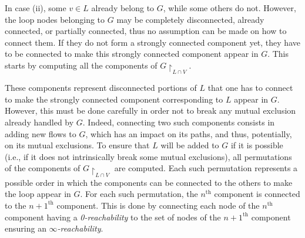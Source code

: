 \documentclass{article}
\newcommand{\graph}{G~=~(V,~E,~\Sigma)}
\newcommand{\restrictionof}[2]{\ensuremath{#1\restriction_{#2}}}
\newcommand{\transition}[2]{#1~\rightarrow~#2}
\newtheorem{definition}{Definition}
\begin{document}
	In case (ii), some $v \in L$ already belong to $G$, while some others do not.
	However, the loop nodes belonging to $G$ may be completely disconnected, already connected, or partially connected, thus no assumption can be made on how to connect them.
	If they do not form a strongly connected component yet, they have to be connected to make this strongly connected component appear in $G$.
	This starts by computing all the components of $\restrictionof{G}{L \cap V}$.
	
	\begin{comment}
		These graphs have the particularity of being \textit{directly connected}.
		
		\begin{definition}[Directly Connected Graph]
			Let $\graph$ be a graph.
			A graph $\widehat{G} = (\widehat{V} \subseteq V, \ \widehat{E} \subseteq \widehat{V} \times \widehat{V}, \ \widehat{\Sigma} \subseteq \Sigma)$ is said to be directly connected if and only if $\forall v_i \in \widehat{V}, \ \exists v_j \in \widehat{V}, \ v_i \neq v_j$, such that $\transition{v_i}{v_j} \in E \ \lor \ \transition{v_j}{v_i} \in E$.
		\end{definition}
		
		Then, the largest of them, called \textit{largest connected graphs}, are retrieved, as they represent the largest disconnected portions of the loop to insert.
		
		\begin{definition}[Largest Directly Connected Graph]
			Let $\graph$ be a graph and $S_{\widehat{G}} = \{\widehat{G}_1, ..., \widehat{G}_n\}$ be the set of all directly connected sub-graphs such that $V_{\widehat{G}_1} = V_{\widehat{G}_2} = ... = V_{\widehat{G}_n}$ and $E_{\widehat{G}_1} \neq E_{\widehat{G}_2} \neq ... \neq E_{\widehat{G}_n}$. The largest directly connected sub-graph of $S_{\widehat{G}}$ is the graph $\widehat{G}_L \in S_{\widehat{G}}$ such that $\lvert E_{\widehat{G}_L} \rvert = \max\limits_{i \in [1...n]} \lvert E_{\widehat{G}_i} \rvert$.
		\end{definition}
	\end{comment}
	
	These components represent disconnected portions of $L$ that one has to connect to make the strongly connected component corresponding to $L$ appear in $G$.
	However, this must be done carefully in order not to break any mutual exclusion already handled by $G$.
	Indeed, connecting two such components consists in adding new flows to $G$, which has an impact on its paths, and thus, potentially, on its mutual exclusions.
	To ensure that $L$ will be added to $G$ if it is possible (i.e., if it does not intrinsically break some mutual exclusions), all permutations of the components of $\restrictionof{G}{L \cap V}$ are computed.
	Each such permutation represents a possible order in which the components can be connected to the others to make the loop appear in $G$.
	For each such permutation, the $n^{\text{th}}$ component is connected to the ${n+1}^{\text{th}}$ component.
	This is done by connecting each node of the $n^{\text{th}}$ component having a \textit{0-reachability} to the set of nodes of the ${n+1}^{\text{th}}$ component ensuring an $\infty$\textit{-reachability}.
	
\end{document}
